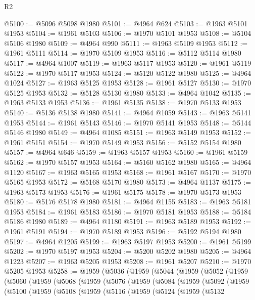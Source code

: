 \begin{lexlean}{R2}
\begin{coremodule}
@5100 := @5096 @5098 @1980
@5101 := @4964 @624
@5103 := @1963 @5101 @1953
@5104 := @1961 @5103
@5106 := @1970 @5101 @1953
@5108 := @5104 @5106 @1980
@5109 := @4964 @990
@5111 := @1963 @5109 @1953
@5112 := @1961 @5111
@5114 := @1970 @5109 @1953
@5116 := @5112 @5114 @1980
@5117 := @4964 @1007
@5119 := @1963 @5117 @1953
@5120 := @1961 @5119
@5122 := @1970 @5117 @1953
@5124 := @5120 @5122 @1980
@5125 := @4964 @1024
@5127 := @1963 @5125 @1953
@5128 := @1961 @5127
@5130 := @1970 @5125 @1953
@5132 := @5128 @5130 @1980
@5133 := @4964 @1042
@5135 := @1963 @5133 @1953
@5136 := @1961 @5135
@5138 := @1970 @5133 @1953
@5140 := @5136 @5138 @1980
@5141 := @4964 @1059
@5143 := @1963 @5141 @1953
@5144 := @1961 @5143
@5146 := @1970 @5141 @1953
@5148 := @5144 @5146 @1980
@5149 := @4964 @1085
@5151 := @1963 @5149 @1953
@5152 := @1961 @5151
@5154 := @1970 @5149 @1953
@5156 := @5152 @5154 @1980
@5157 := @4964 @646
@5159 := @1963 @5157 @1953
@5160 := @1961 @5159
@5162 := @1970 @5157 @1953
@5164 := @5160 @5162 @1980
@5165 := @4964 @1120
@5167 := @1963 @5165 @1953
@5168 := @1961 @5167
@5170 := @1970 @5165 @1953
@5172 := @5168 @5170 @1980
@5173 := @4964 @1137
@5175 := @1963 @5173 @1953
@5176 := @1961 @5175
@5178 := @1970 @5173 @1953
@5180 := @5176 @5178 @1980
@5181 := @4964 @1155
@5183 := @1963 @5181 @1953
@5184 := @1961 @5183
@5186 := @1970 @5181 @1953
@5188 := @5184 @5186 @1980
@5189 := @4964 @1180
@5191 := @1963 @5189 @1953
@5192 := @1961 @5191
@5194 := @1970 @5189 @1953
@5196 := @5192 @5194 @1980
@5197 := @4964 @1205
@5199 := @1963 @5197 @1953
@5200 := @1961 @5199
@5202 := @1970 @5197 @1953
@5204 := @5200 @5202 @1980
@5205 := @4964 @1223
@5207 := @1963 @5205 @1953
@5208 := @1961 @5207
@5210 := @1970 @5205 @1953
@5258 := @1959
    (@5036
      (@1959
        (@5044
          (@1959
            (@5052
              (@1959
                (@5060
                  (@1959
                    (@5068
                      (@1959
                        (@5076
                          (@1959
                            (@5084
                              (@1959
                                (@5092
                                  (@1959
                                    (@5100
                                      (@1959
                                        (@5108
                                          (@1959
                                            (@5116
                                              (@1959
                                                (@5124
                                                  (@1959
                                                    (@5132

\end{coremodule}
\end{lexlean}
